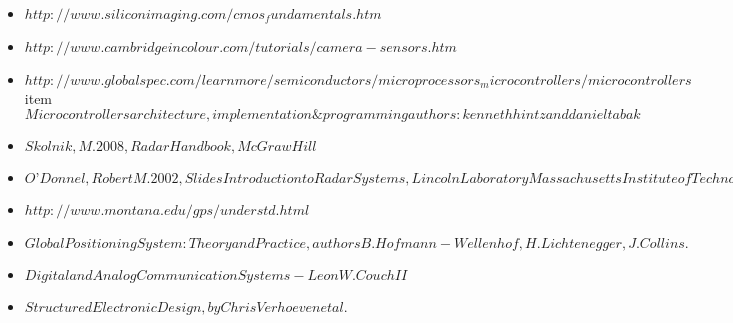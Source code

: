 \documentclass{article}
\begin{document}
\begin{itemize}
\item
$http://www.siliconimaging.com/cmos_fundamentals.htm$
\item
$http://www.cambridgeincolour.com/tutorials/camera-sensors.htm$
\item
$http://www.globalspec.com/learnmore/semiconductors/microprocessors_microcontrollers/microcontrollers$
item
$Microcontrollers architecture, implementation \& programming 
authors : kenneth hintz and daniel tabak$
\item
$ Skolnik, M. 2008, Radar Handbook, McGraw Hill$
\item
$ O’Donnel, Robert M. 2002, Slides Introduction to Radar Systems, Lincoln Laboratory Massachusetts Institute of Technology$
\item
$http://www.montana.edu/gps/understd.html$
\item
$Global Positioning System: Theory and Practice ,authors  B. Hofmann-Wellenhof,H. Lichtenegger,J. Collins.$
\item
$Digital and Analog Communication Systems - Leon W. Couch II$
\item
$Structured Electronic Design, by Chris Verhoeven et al.$
\end{itemize}
\end{document}
